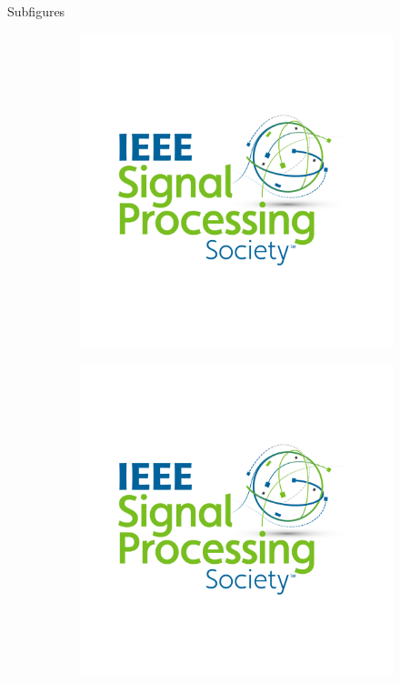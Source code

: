 \documentclass[aspectratio=169]{beamer}
\begin{document}
\begin{frame}{Subfigures}

\begin{figure}
    \centering
    \begin{subfigure}[b]{0.45\linewidth}
        \centering
        \includegraphics[width=\linewidth]{template/sps_logo.png}
    \end{subfigure}
    \hfill 
    \begin{subfigure}[b]{0.45\linewidth}
        \centering
        \includegraphics[width=\linewidth]{template/sps_logo.png}
    \end{subfigure}
\end{figure}


\end{frame}
\end{document}
